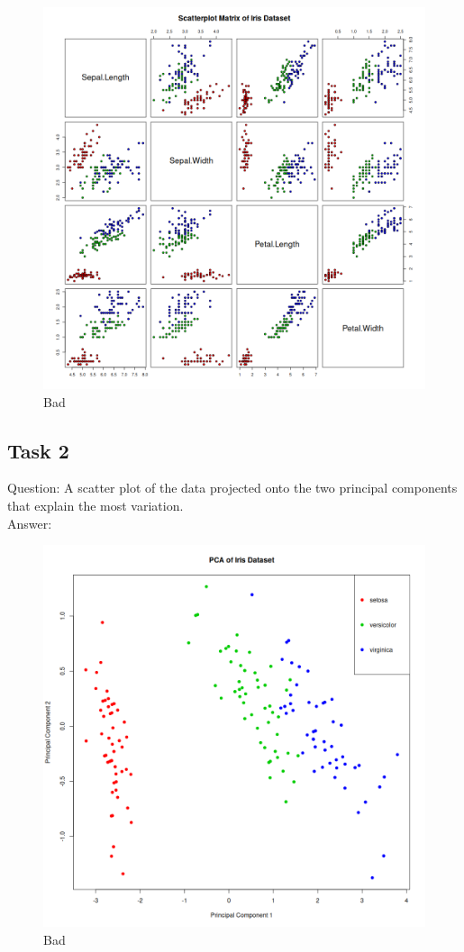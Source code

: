 \documentclass[12pt,a4paper]{report}
\begin{document}
\begin{figure}[H]
\centering
\includegraphics[width=\textwidth]{../Code/week12/task 1.png} 
\caption{Bad}
\end{figure}


\subsection{Task 2}
Question: A scatter plot of the data projected onto the two principal components that explain the
most variation.
\\
Answer: 

\begin{figure}[H]
\centering
\includegraphics[width=\textwidth]{../Code/week12/task2.png}
\caption{Bad}
\end{figure}
\end{document}

